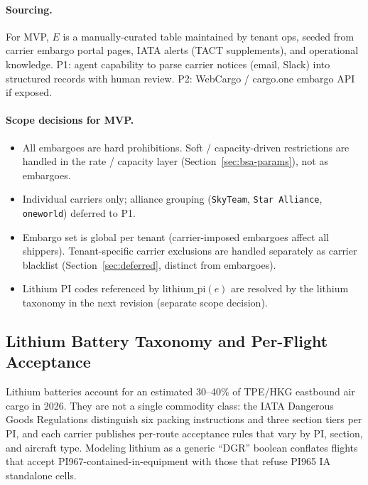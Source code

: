 \documentclass[11pt,a4paper]{article}
\theoremstyle{definition}
\begin{document}
\paragraph{Sourcing.}
For MVP, \(E\) is a manually-curated table maintained by tenant ops, seeded from
carrier embargo portal pages, IATA alerts (TACT supplements), and operational
knowledge. P1: agent capability to parse carrier notices (email, Slack) into
structured records with human review. P2: WebCargo / cargo.one embargo API if
exposed.

\paragraph{Scope decisions for MVP.}
\begin{itemize}[noitemsep]
  \item All embargoes are hard prohibitions. Soft / capacity-driven restrictions
        are handled in the rate / capacity layer (Section~\ref{sec:bsa-params}), not as embargoes.
  \item Individual carriers only; alliance grouping (\texttt{SkyTeam}, \texttt{Star Alliance},
        \texttt{oneworld}) deferred to P1.
  \item Embargo set is global per tenant (carrier-imposed embargoes affect all
        shippers). Tenant-specific carrier exclusions are handled separately as
        carrier blacklist (Section~\ref{sec:deferred}, distinct from embargoes).
  \item Lithium PI codes referenced by \(\text{lithium\_pi}(e)\) are resolved by
        the lithium taxonomy in the next revision (separate scope decision).
\end{itemize}

\subsection{Lithium Battery Taxonomy and Per-Flight Acceptance}
\label{sec:lithium}

Lithium batteries account for an estimated 30--40\% of TPE/HKG eastbound air cargo
in 2026. They are not a single commodity class: the IATA Dangerous Goods Regulations
distinguish six packing instructions and three section tiers per PI, and each carrier
publishes per-route acceptance rules that vary by PI, section, and aircraft type.
Modeling lithium as a generic ``DGR'' boolean conflates flights that accept
PI967-contained-in-equipment with those that refuse PI965 IA standalone cells.
\end{document}
